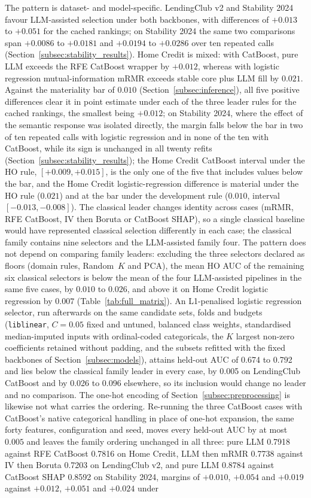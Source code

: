 \documentclass[final,5p,twocolumn]{elsarticle}
\newcommand{\Kfeat}{K}
\begin{document}
The pattern is dataset- and model-specific. LendingClub v2 and Stability 2024 favour LLM-assisted selection under both backbones, with differences of $+0.013$ to $+0.051$ for the cached rankings; on Stability 2024 the same two comparisons span $+0.0086$ to $+0.0181$ and $+0.0194$ to $+0.0286$ over ten repeated calls (Section~\ref{subsec:stability_results}). Home Credit is mixed: with CatBoost, pure LLM exceeds the RFE CatBoost wrapper by $+0.012$, whereas with logistic regression mutual-information mRMR exceeds stable core plus LLM fill by $0.021$. Against the materiality bar of $0.010$ (Section~\ref{subsec:inference}), all five positive differences clear it in point estimate under each of the three leader rules for the cached rankings, the smallest being $+0.012$; on Stability 2024, where the effect of the semantic response was isolated directly, the margin falls below the bar in two of ten repeated calls with logistic regression and in none of the ten with CatBoost, while its sign is unchanged in all twenty refits (Section~\ref{subsec:stability_results}); the Home Credit CatBoost interval under the HO rule, $[+0.009, +0.015]$, is the only one of the five that includes values below the bar, and the Home Credit logistic-regression difference is material under the HO rule ($0.021$) and at the bar under the development rule ($0.010$, interval $[-0.013, -0.008]$). The classical leader changes identity across cases (mRMR, RFE CatBoost, IV then Boruta or CatBoost SHAP), so a single classical baseline would have represented classical selection differently in each case; the classical family contains nine selectors and the LLM-assisted family four. The pattern does not depend on comparing family leaders: excluding the three selectors declared as floors (domain rules, Random~$\Kfeat$ and PCA), the mean HO AUC of the remaining six classical selectors is below the mean of the four LLM-assisted pipelines in the same five cases, by $0.010$ to $0.026$, and above it on Home Credit logistic regression by $0.007$ (Table~\ref{tab:full_matrix}). An L1-penalised logistic regression selector, run afterwards on the same candidate sets, folds and budgets (\texttt{liblinear}, $C=0.05$ fixed and untuned, balanced class weights, standardised median-imputed inputs with ordinal-coded categoricals, the $\Kfeat$ largest non-zero coefficients retained without padding, and the subsets refitted with the fixed backbones of Section~\ref{subsec:models}), attains held-out AUC of 0.674 to 0.792 and lies below the classical family leader in every case, by 0.005 on LendingClub CatBoost and by 0.026 to 0.096 elsewhere, so its inclusion would change no leader and no comparison. The one-hot encoding of Section~\ref{subsec:preprocessing} is likewise not what carries the ordering. Re-running the three CatBoost cases with CatBoost's native categorical handling in place of one-hot expansion, the same forty features, configuration and seed, moves every held-out AUC by at most $0.005$ and leaves the family ordering unchanged in all three: pure LLM 0.7918 against RFE CatBoost 0.7816 on Home Credit, LLM then mRMR 0.7738 against IV then Boruta 0.7203 on LendingClub v2, and pure LLM 0.8784 against CatBoost SHAP 0.8592 on Stability 2024, margins of $+0.010$, $+0.054$ and $+0.019$ against $+0.012$, $+0.051$ and $+0.024$ under 
\end{document}
